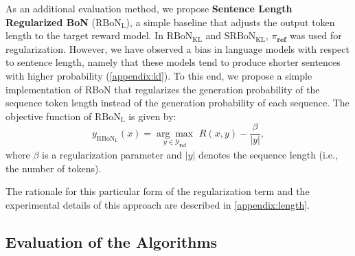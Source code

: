  As an additional evaluation method, we propose \textbf{Sentence Length Regularized BoN} ($\mathrm{RBoN}_{\mathrm{L}}$), a simple baseline that adjusts the output token length to the target reward model.
In $\mathrm{RBoN}_{\mathrm{KL}}$ and $\mathrm{SRBoN}_{\mathrm{KL}}$, $\pi_{\textbf{ref}}$ was used for regularization. However, we have observed a bias in language models with respect to sentence length, namely that these models tend to produce shorter sentences with higher probability (\cref{appendix:kl}). %
To this end, we propose a simple implementation of RBoN that regularizes the generation probability of the sequence token length instead of the generation probability of each sequence.
The objective function of $\mathrm{RBoN}_{\mathrm{L}}$ is given by:
\begin{equation}
y_{\mathrm{RBoN_\mathrm{L}}}(x)=\underset{y \in \mathcal{Y}_{\textbf{ref}}}{\arg \max } \,\,R(x, y)-\frac{\beta}{|y|},
\end{equation}
where $\beta$ is a regularization parameter and $|y|$ denotes the sequence length (i.e., the number of tokens).

The rationale for this particular form of the regularization term and the experimental details of this approach are described in \cref{appendix:length}.

\subsection{Evaluation of the Algorithms}\label{sec:exp_1}

